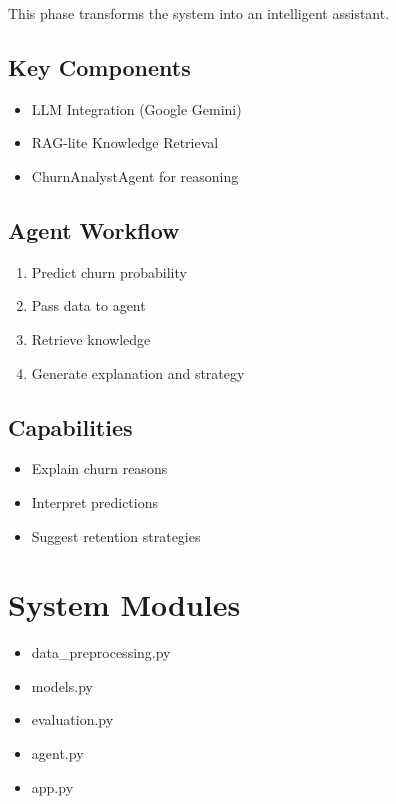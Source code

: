 \documentclass[12pt]{article}
\begin{document}
This phase transforms the system into an intelligent assistant.

\subsection{Key Components}
\begin{itemize}
\item LLM Integration (Google Gemini)
\item RAG-lite Knowledge Retrieval
\item ChurnAnalystAgent for reasoning
\end{itemize}

\subsection{Agent Workflow}
\begin{enumerate}
\item Predict churn probability
\item Pass data to agent
\item Retrieve knowledge
\item Generate explanation and strategy
\end{enumerate}

\subsection{Capabilities}
\begin{itemize}
\item Explain churn reasons
\item Interpret predictions
\item Suggest retention strategies
\end{itemize}

\section{System Modules}

\begin{itemize}
\item data\_preprocessing.py
\item models.py
\item evaluation.py
\item agent.py
\item app.py
\end{itemize}

\end{document}
